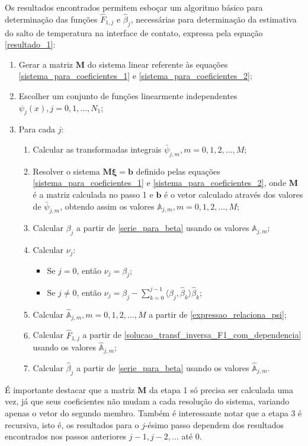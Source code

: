 Os resultados encontrados permitem esboçar um algoritmo básico para determinação das funções $\hat{F}_{1,j}$ e $\hat{\beta}_j$, necessárias para determinação da estimativa do salto de temperatura na interface de contato, expressa pela equação \eqref{resultado_1}:
\begin{enumerate}
	\item Gerar a matriz $\mathbf{M}$ do sistema linear referente às equações \eqref{sistema_para_coeficientes_1} e \eqref{sistema_para_coeficientes_2};
	\item Escolher um conjunto de funções linearmente independentes $\psi_j(x), j=0,1,\ldots,N_1$;
	\item Para cada $j$:
	\begin{enumerate}	
		\item Calcular as transformadas integrais $\bar{\psi}_{j,m}, m=0,1,2, \ldots, M$;
		\item Resolver o sistema $\mathbf{M}\mathbf{\xi} = \mathbf{b}$ definido pelas equações \eqref{sistema_para_coeficientes_1} e \eqref{sistema_para_coeficientes_2}, onde $\mathbf{M}$ é a matriz calculada no passo 1 e $\mathbf{b}$ é o vetor calculado através dos valores de $\bar{\psi}_{j,m}$, obtendo assim os valores $\mathbb{A}_{j,m}, m=0,1,2, \ldots, M$;
		\item Calcular $\beta_j$ a partir de \eqref{serie_para_beta} usando os valores $\mathbb{A}_{j,m}$;
		\item Calcular $\nu_j$:
		\begin{itemize}
			\item Se $j = 0$, então $\nu_j = \beta_j$;
			\item Se $j \ne 0$, então $\nu_j = \beta_j - \displaystyle\sum_{k = 0}^{j - 1} \langle \beta_j, \hat{\beta}_k\rangle\hat{\beta}_k$;
		\end{itemize}
		\item Calcular $\hat{\mathbb{A}}_{j,m}, m=0,1,2, \ldots, M$ a partir de \eqref{expressao_relaciona_psi};
		\item Calcular $\hat{F}_{1,j}$ a partir de \eqref{solucao_transf_inversa_F1_com_dependencia} usando os valores $\hat{\mathbb{A}}_{j,m}$;
		\item Calcular $\hat{\beta}_j$ a partir de \eqref{serie_para_beta} usando os valores $\hat{\mathbb{A}}_{j,m}$.
	\end{enumerate}
\end{enumerate}

É importante destacar que a matriz $\mathbf{M}$ da etapa 1 só precisa ser calculada uma vez, já que seus coeficientes não mudam a cada resolução do sistema, variando apenas o vetor do segundo membro. Também é interessante notar que a etapa 3 é recursiva, isto é, os resultados para o $j$-ésimo passo dependem dos resultados encontrados nos passos anteriores $j - 1, j - 2, \ldots$ até 0.

